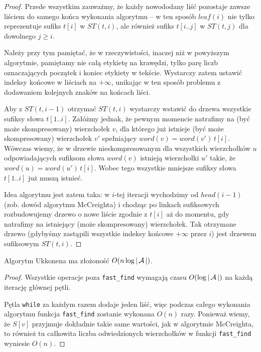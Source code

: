 \begin{proof}
  Przede wszystkim zauważmy, że każdy nowododany liść pozostaje zawsze liściem do samego końca wykonania algorytmu -- w ten sposób $leaf(i)$ nie tylko reprezentuje sufiks $t[i]$ w $ST(t, i)$, ale również sufiks $t[i..j]$ w $ST(t, j)$ dla dowolnego $j \ge i$.
  
  Należy przy tym pamiętać, że w rzeczywistości, inaczej niż w powyższym algorytmie, pamiętamy nie całą etykietę na krawędzi, tylko parę liczb oznaczających początek i koniec etykiety w tekście. Wystarczy zatem ustawić indeksy końcowe w liściach na $+\infty$, unikając w ten sposób problemu z dodawaniem kolejnych znaków na końcach liści.
  
  Aby z $ST(t, i - 1)$ otrzymać $ST(t, i)$ wystarczy wstawić do drzewa wszystkie sufiksy słowa $t[1..i]$. Załóżmy jednak, że pewnym momencie natrafimy na (być może skompresowany) wierzchołek $v$, dla którego już istnieje (być może skompresowany) wierzchołek $v'$ spełniający $word(v) = word(v') \, t[i]$. Wówczas wiemy, że w drzewie nieskompresowanym dla wszystkich wierzchołków $u$ odpowiadających sufiksom słowa $word(v)$ istnieją wierzchołki $u'$ takie, że $word(u) = word(u') \, t[i]$. Wobec tego wszystkie mniejsze sufiksy słowa $t[1..i]$ już muszą istnieć.
  
  Idea algorytmu jest zatem taka: w $i$-tej iteracji wychodzimy od $head(i - 1)$ (zob. dowód algorytmu McCreighta) i chodząc po linkach sufiksowych rozbudowujemy drzewo o nowe liście zgodnie z $t[i]$ aż do momentu, gdy natrafimy na istniejący (może skompresowany) wierzchołek. Tak otrzymane drzewo (gdybyśmy zastąpili wszystkie indeksy końcowe $+\infty$ przez $i$) jest drzewem sufiksowym $ST(t, i)$.
\end{proof}

\begin{theorem}{}{}
  Algorytm Ukkonena ma złożoność $O(n \log{|\operatorname{\mathcal{A}}|})$.
\end{theorem}

\begin{proof}
  Wszystkie operacje poza \texttt{fast\_find} wymagają czasu $O(\log{|\operatorname{\mathcal{A}}|})$ na każdą iterację głównej pętli.
  
  Pętla \texttt{while} za każdym razem dodaje jeden liść, więc podczas całego wykonania algorytmu funkcja \texttt{fast\_find} zostanie wykonana $O(n)$ razy.
  Ponieważ wiemy, że $S[v]$ przyjmuje dokładnie takie same wartości, jak w algorytmie McCreighta, to również tu całkowita liczba odwiedzionych wierzchołków w funkcji \texttt{fast\_find} wyniesie $O(n)$.
\end{proof}

